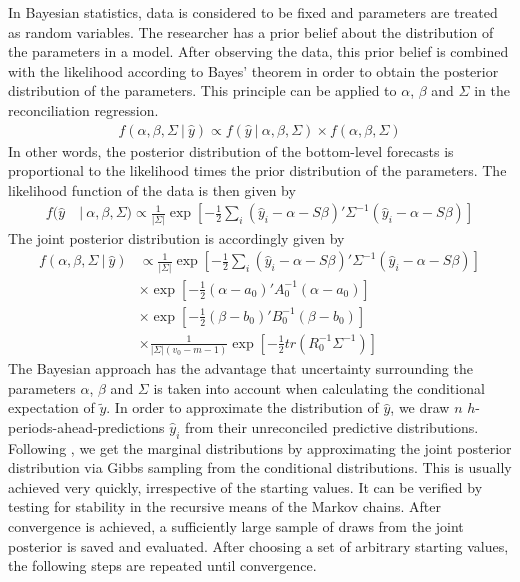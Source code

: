 \documentclass[a4paper,fleqn,11pt]{article}
\begin{document}
In Bayesian statistics, data is considered to be fixed and parameters are treated as random variables. The researcher has a prior belief about the distribution of the parameters in a model. After observing the data, this prior belief is combined with the likelihood according to Bayes' theorem in order to obtain the posterior distribution of the parameters. This principle can be applied to $\alpha$, $\beta$ and $\Sigma$ in the reconciliation regression.
\begin{align}
	f(\alpha, \beta, \Sigma\ |\ \hat{y}) \propto f(\hat{y}\ |\ \alpha, \beta, \Sigma) \times f(\alpha, \beta, \Sigma)
\end{align}
In other words, the posterior distribution of the bottom-level forecasts is proportional to the likelihood times the prior distribution of the parameters. The likelihood function of the data is then given by
\begin{align*}
f(\hat{y}\ &|\ \alpha,\beta,\Sigma) \propto \frac{1}{|\Sigma|} \exp\left[-\frac{1}{2} \sum_i  (\hat{y}_i - \alpha - S\beta)'\Sigma^{-1}(\hat{y}_i - \alpha - S\beta)\right]
\end{align*}
The joint posterior distribution is accordingly given by
\begin{align*}
f(\alpha,\beta,\Sigma\ |\ \hat{y}) & \propto \frac{1}{|\Sigma|} \exp\left[-\frac{1}{2} \sum_i  (\hat{y}_i - \alpha - S\beta)'\Sigma^{-1}(\hat{y}_i - \alpha - S\beta)\right] \\
&\times \exp \left[-\frac{1}{2}(\alpha - a_0)'A_0^{-1}(\alpha - a_0)\right] \\
&\times \exp \left[-\frac{1}{2}(\beta - b_0)'B_0^{-1}(\beta - b_0)\right] \\
&\times \frac{1}{|\Sigma|(v_0 - m - 1)} \exp \left[-\frac{1}{2} tr(R_0^{-1}\Sigma^{-1}) \right]
\end{align*}
The Bayesian approach has the advantage that uncertainty surrounding the parameters $\alpha$, $\beta$ and $\Sigma$ is taken into account when calculating the conditional expectation of $\tilde{y}$. In order to approximate the distribution of $\hat{y}$, we draw $n$ $h$-periods-ahead-predictions $\hat{y}_i$ from their unreconciled predictive distributions. Following \cite{Percy1992}, we get the marginal distributions by approximating the joint posterior distribution via Gibbs sampling from the conditional distributions.  This is usually achieved very quickly, irrespective of the starting values. It can be verified by testing for stability in the recursive means of the Markov chains. After convergence is achieved, a sufficiently large sample of draws from the joint posterior is saved and evaluated. After choosing a set of arbitrary starting values, the following steps are repeated until convergence.\\
\end{document}
